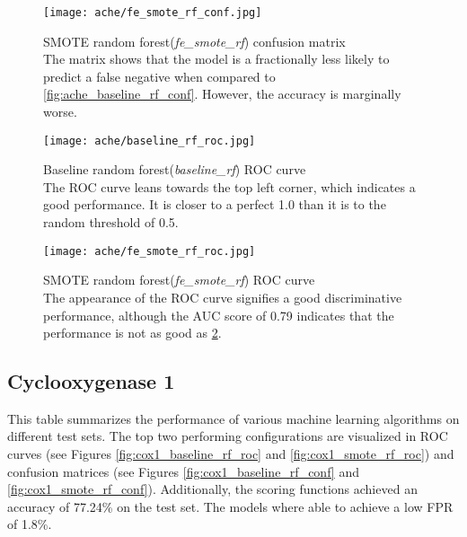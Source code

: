 \begin{figure}[H]
    \begin{center}
        \captionsetup{justification=centering}
        \texttt{[image: ache/fe\_smote\_rf\_conf.jpg]}
        \caption[]{SMOTE random forest(\textit{fe\_smote\_rf}) confusion matrix\\The matrix shows that the model is a fractionally less likely to predict a false negative when compared to \ref*{fig:ache_baseline_rf_conf}. However, the accuracy is marginally worse.}
        \label{fig:ache_smote_rf_conf}
    \end{center}
\end{figure}

\begin{figure}[H]
    \begin{center}
        \captionsetup{justification=centering}
        \texttt{[image: ache/baseline\_rf\_roc.jpg]}
        \caption[]{Baseline random forest(\textit{baseline\_rf}) ROC curve\\The ROC curve leans towards the top left corner, which indicates a good performance. It is closer to a perfect 1.0 than it is to the random threshold of 0.5.}
        \label{fig:ache_baseline_rf_roc}
    \end{center}
\end{figure}

\begin{figure}[H]
    \begin{center}
        \captionsetup{justification=centering}
        \texttt{[image: ache/fe\_smote\_rf\_roc.jpg]}
        \caption[]{SMOTE random forest(\textit{fe\_smote\_rf}) ROC curve\\The appearance of the ROC curve signifies a good discriminative performance, although the AUC score of 0.79 indicates that the performance is not as good as \ref*{fig:ache_baseline_rf_roc}.        }
        \label{fig:ache_smote_rf_roc}
    \end{center}
\end{figure}

\subsection{Cyclooxygenase 1}
This table summarizes the performance of various machine learning algorithms on different test sets.
The top two performing configurations are visualized in ROC curves (see Figures \ref{fig:cox1_baseline_rf_roc} and \ref{fig:cox1_smote_rf_roc})
and confusion matrices (see Figures \ref{fig:cox1_baseline_rf_conf} and \ref{fig:cox1_smote_rf_conf}). Additionally,
the scoring functions achieved an accuracy of 77.24\% on the test set. The models where able to achieve a low FPR of 1.8\%.

